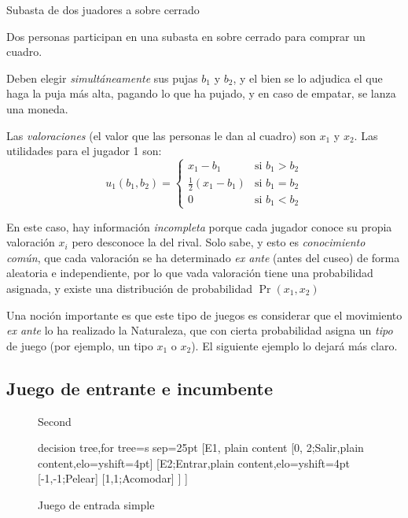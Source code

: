 \documentclass[12pt]{article}
\begin{document}
\begin{exbox}{Subasta de dos juadores a sobre cerrado}
	\begin{myitemize}
		\item Dos personas participan en una subasta en sobre cerrado para comprar un cuadro.
		\item Deben elegir \textit{simultáneamente} sus pujas $b_1$ y $b_2$, y el bien se lo adjudica el que haga la puja más alta, pagando lo que ha pujado, y en caso de empatar, se lanza una moneda.
		\item Las \textit{valoraciones} (el valor que las personas le dan al cuadro) son $x_1$ y $x_2$. Las utilidades para el jugador 1 son:
		\[ u_1(b_1, b_2) =
			\begin{cases}
				x_1 - b_1              & \mbox{si } b_1 > b_2 \\
				\frac{1}{2}(x_1 - b_1) & \mbox{si } b_1 = b_2 \\
				0                      & \mbox{si } b_1 < b_2
			\end{cases}
		\]

	\end{myitemize}

	En este caso, hay información \textit{incompleta} porque cada jugador conoce su propia valoración $x_i$ pero desconoce la del rival. Solo sabe, y esto es \textit{conocimiento común}, que cada valoración se ha determinado \textit{ex ante} (antes del cuseo) de forma aleatoria e independiente, por lo que vada valoración tiene una probabilidad asignada, y existe una distribución de probabilidad $\Pr(x_1, x_2)$

\end{exbox}

Una noción importante es que este tipo de juegos es considerar que el movimiento \textit{ex ante} lo ha realizado la Naturaleza, que con cierta probabilidad asigna un \textit{tipo} de juego (por ejemplo, un tipo $x_1$ o $x_2$). El siguiente ejemplo lo dejará más claro.

\subsection*{Juego de entrante e incumbente}

\begin{figure}[H]
	\centering
	\footnotesize{Second
		\begin{forest} decision tree,for tree={s sep=25pt}
				[E1, plain content
						[{0, 2};Salir,plain content,elo={yshift=4pt}]
						[E2;Entrar,plain content,elo={yshift=4pt}
								[{-1,-1};Pelear]
								[{1,1};Acomodar]
						]
				]
		\end{forest}}
	\caption{Juego de entrada simple}
\end{figure}
\end{document}
